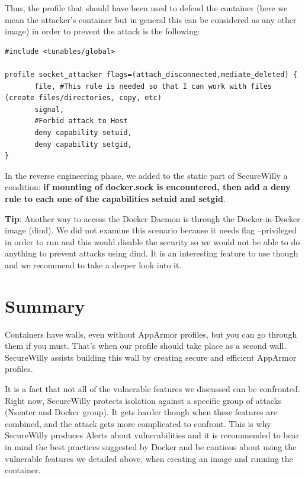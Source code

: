 Thus, the profile that should have been used to defend the container (here we mean the attacker's container but in general this can be considered as any other image) in order to prevent the attack is the following:
\begin{lstlisting}[style=Dockerfile, caption={AppArmor profile socket\_attacker}]
#include <tunables/global>

profile socket_attacker flags=(attach_disconnected,mediate_deleted) {
       file, #This rule is needed so that I can work with files (create files/directories, copy, etc)
       signal,
       #Forbid attack to Host
       deny capability setuid,
       deny capability setgid,
}
\end{lstlisting}


In the reverse engineering phase, we added to the static part of SecureWilly a condition: \textbf{if mounting of docker.sock is encountered, then add a deny rule to each one of the capabilities setuid and setgid}.

\begin{mdframed}[backgroundcolor=tipcolor]
\textbf{Tip}: Another way to access the Docker Daemon is through the Docker-in-Docker image (dind). We did not examine this scenario because it needs flag --privileged in order to run and this would disable the security so we would not be able to do anything to prevent attacks using dind. It is an interesting feature to use though and we recommend to take a deeper look into it. \cite{dind}
\end{mdframed}

\section{Summary}
Containers have walls, even without AppArmor profiles, but you can go through them if you must. That's when our profile should take place as a second wall. SecureWilly assists building this wall by creating secure and efficient AppArmor profiles.

It is a fact that not all of the vulnerable features we discussed can be confronted. Right now, SecureWilly protects isolation against a specific group of attacks (Nsenter and Docker group). It gets harder though when these features are combined, and the attack gets more complicated to confront. This is why SecureWilly produces Alerts about vulnerabilities and it is recommended to bear in mind the best practices suggested by Docker \cite{dockerbestpr} and be cautious about using the vulnerable features we detailed above, when creating an image and running the container.
